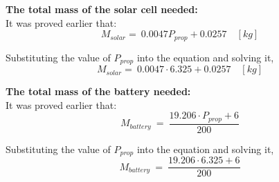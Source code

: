 \vspace{1cm}

\p \textbf{The total mass of the solar cell needed:} \vspace{0.1cm}\\
It was proved earlier that:
\[
M_{solar} = \ 0.0047 P_{prop} + 0.0257  \quad [kg]
\]

Substituting the value of $ P_{prop} $ into the equation and solving it,
\[
M_{solar} = \ 0.0047 \cdot 6.325 + 0.0257  \quad [kg]
\]
\begin{center}
\end{center}

\vspace{1cm}

\p \textbf{The total mass of the battery needed:} \vspace{0.1cm}\\
It was proved earlier that:
\[
M_{battery} \ = \ \frac{ 19.206 \cdot P_{prop} + 6 }{ 200 }
\]

Substituting the value of $ P_{prop} $ into the equation and solving it,
\[
M_{battery} \ = \ \frac{ 19.206 \cdot 6.325 + 6 }{ 200 }
\]
\begin{center}
\end{center}
